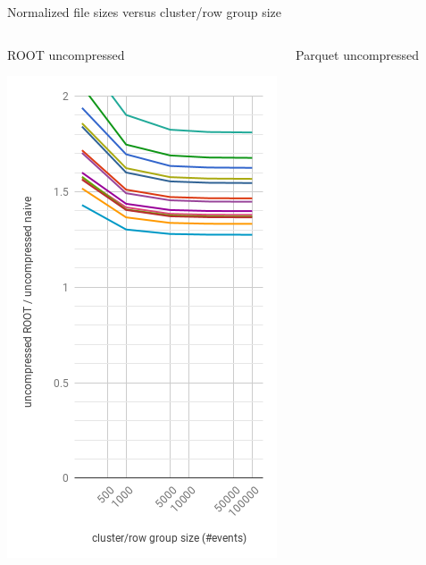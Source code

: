 \documentclass[aspectratio=169]{beamer}
\begin{document}
\begin{frame}{Normalized file sizes versus cluster/row group size}
\vspace{-0.1 cm}
\small
\begin{columns}
\begin{center}
\normalsize ROOT uncompressed

\includegraphics[width=\linewidth]{root-none.png}
\end{center}
\begin{center}
\normalsize Parquet uncompressed


\end{center}
\end{columns}
\end{frame}
\end{document}
